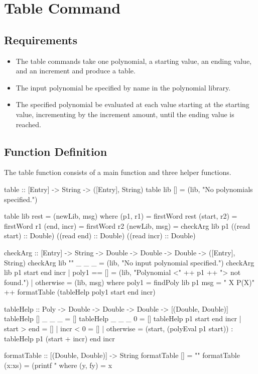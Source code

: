 \section{Table Command}
\subsection{Requirements}
\begin{itemize}
\item The table commands  take one polynomial, a starting value, an ending value, and an increment and produce a table.
\item The input polynomial  be specified by name in the polynomial library.
\item The specified polynomial  be evaluated at each value starting at the starting value, incrementing by the increment amount, until the ending value is reached.
\end{itemize}
\subsection{Function Definition}
The table function consists of a main function and three helper functions.
\begin{code}
table :: [Entry] -> String -> ([Entry], String)
table lib [] = (lib, "No polynomials specified.")

table lib rest = (newLib, msg)
  where
    (p1, r1) = firstWord rest
    (start, r2) = firstWord r1
    (end, incr) = firstWord r2
    (newLib, msg) = checkArg lib p1 ((read start) :: Double) ((read end) :: Double) ((read incr) :: Double)

    checkArg :: [Entry] -> String -> Double -> Double -> Double -> ([Entry], String)
    checkArg lib "" _ _ _ = (lib, "No input polynomial specified.")
    checkArg lib p1 start end incr
      | poly1 == [] = (lib, "Polynomial <" ++ p1 ++ "> not found.")
      | otherwise   = (lib, msg)
      where
        poly1 = findPoly lib p1
        msg = "  X  P(X)\n" ++ formatTable (tableHelp poly1 start end incr)

    tableHelp :: Poly -> Double -> Double -> Double -> [(Double, Double)]
    tableHelp [] _ _ _ = []
    tableHelp _ _ _ 0 = []
    tableHelp p1 start end incr
      | start > end = []
      | incr < 0    = []
      | otherwise   = (start, (polyEval p1 start)) : tableHelp p1 (start + incr) end incr

    formatTable :: [(Double, Double)] -> String
    formatTable [] = ""
    formatTable (x:xs) = (printf "%
      where
        (y, fy) = x
\end{code}


